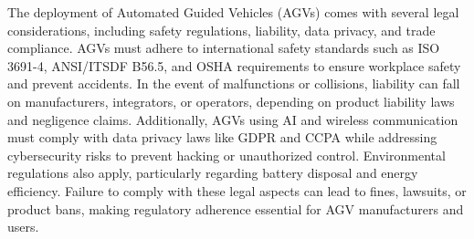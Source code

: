 \documentclass[../../main]{subfiles}
\begin{document}
The deployment of Automated Guided Vehicles (AGVs) comes with several legal considerations, including safety regulations, 
liability, data privacy, and trade compliance. AGVs must adhere to international safety standards such as ISO 3691-4, 
ANSI/ITSDF B56.5\cite{ANSIITSDFB56.5}, and OSHA requirements\cite{OSHArequirements} to ensure workplace safety and prevent accidents. In the event of malfunctions or collisions, 
liability can fall on manufacturers, integrators, or operators, depending on product liability laws and negligence claims.
Additionally, AGVs using AI and wireless communication must comply with data privacy laws like GDPR\cite{GDPR} and CCPA \cite{CCPA} while addressing
cybersecurity risks to prevent hacking or unauthorized control. Environmental regulations also apply, particularly regarding 
battery disposal and energy efficiency. Failure to comply with these legal aspects can lead to fines, lawsuits, or product bans, 
making regulatory adherence essential for AGV manufacturers and users.
\end{document}
